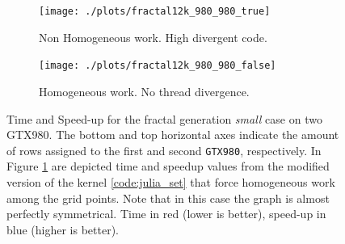 \begin{figure}
    \begin{subfigure}{1.0\textwidth}
        \caption{Non Homogeneous work. High divergent code.}
        \texttt{[image: ./plots/fractal12k\_980\_980\_true]}
        \label{fig:fractal12k_980_980_false}
    \end{subfigure}        
    \endminipage \hfill
     \vspace{5mm}
    \begin{subfigure}{1.0\textwidth}
        \caption{Homogeneous work. No thread divergence.}
        \texttt{[image: ./plots/fractal12k\_980\_980\_false]}

\label{fig:fractal12k_980_980_true}
    \end{subfigure}
    \endminipage\hfill
    \caption[Time and Speed-up for the fractal generation \textit{small} case on two GTX980.]{Time and Speed-up for the fractal generation \textit{small} case on two GTX980. The bottom and top horizontal axes indicate the amount of rows assigned to the first and second \texttt{GTX980}, respectively. In Figure \ref{fig:fractal12k_980_980_false} are depicted time and speedup values from the modified version of the kernel \ref{code:julia_set} that force homogeneous work among the grid points. Note that in this case the graph is almost perfectly symmetrical. Time in red (lower is better), speed-up in blue (higher is better).}
    \label{fig:fractal12k_980_980}
\end{figure}


